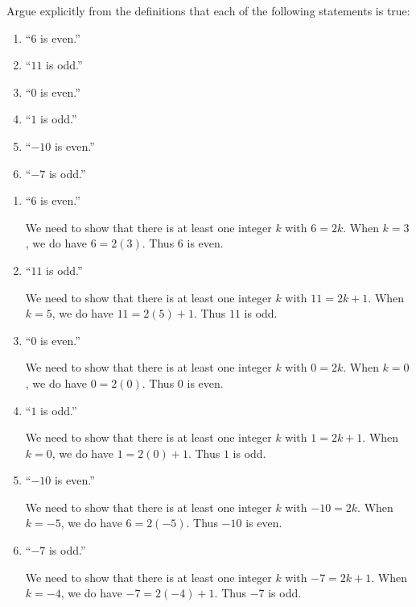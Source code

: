\begin{xca}
	Argue explicitly from the definitions that each of the following statements is true:
	
	\begin{enumerate}
		\item ``$6$ is even.''
		\item ``$11$ is odd.''
		\item ``$0$ is even.''
		\item ``$1$ is odd.''
		\item ``$-10$ is even.''
		\item ``$-7$ is odd.''
	\end{enumerate}
\end{xca}

\begin{solutions}
	
	\begin{enumerate}
		\item ``$6$ is even.'' 
		
		We need to show that there is at least one integer $k$ with $6 = 2k$.  When $k = 3$, we do have $6 = 2(3)$.  Thus $6$ is even.
		
		\item ``$11$ is odd.''
		
		We need to show that there is at least one integer $k$ with $11 = 2k+1$.  When $k = 5$, we do have $11 = 2(5)+1$.  Thus $11$ is odd.
		
		\item ``$0$ is even.''
		
		We need to show that there is at least one integer $k$ with $0 = 2k$.  When $k = 0$, we do have $0 = 2(0)$.  Thus $0$ is even.
		
		\item ``$1$ is odd.'' 
		
		We need to show that there is at least one integer $k$ with $1 = 2k+1$.  When $k = 0$, we do have $1 = 2(0)+1$.  Thus $1$ is odd.
		
		\item ``$-10$ is even.''
		
		We need to show that there is at least one integer $k$ with $-10 = 2k$.  When $k = -5$, we do have $6 = 2(-5)$.  Thus $-10$ is even.
		
		\item ``$-7$ is odd.''
		
		We need to show that there is at least one integer $k$ with $-7 = 2k+1$.  When $k = -4$, we do have $-7 = 2(-4)+1$.  Thus $-7$ is odd.
	\end{enumerate}
\end{solutions}

